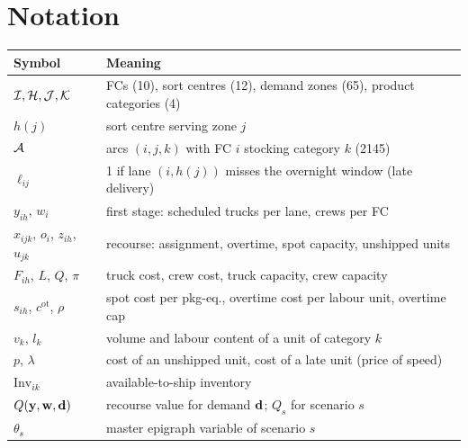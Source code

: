 \section{Notation}\label{app:notation}
\begin{center}\small
\begin{tabular}{@{}ll@{}}
\toprule
Symbol & Meaning \\ \midrule
$\mathcal{I},\mathcal{H},\mathcal{J},\mathcal{K}$ & FCs (10), sort centres (12), demand zones (65), product categories (4)\\
$h(j)$ & sort centre serving zone $j$ \\
$\mathcal{A}$ & arcs $(i,j,k)$ with FC $i$ stocking category $k$ (2145)\\
$\ell_{ij}$ & 1 if lane $(i,h(j))$ misses the overnight window (late delivery)\\
$y_{ih}$, $w_i$ & first stage: scheduled trucks per lane, crews per FC \\
$x_{ijk}$, $o_i$, $z_{ih}$, $u_{jk}$ & recourse: assignment, overtime, spot capacity, unshipped units\\
$F_{ih}$, $L$, $Q$, $\pi$ & truck cost, crew cost, truck capacity, crew capacity \\
$s_{ih}$, $c^{\mathrm{ot}}$, $\rho$ & spot cost per pkg-eq., overtime cost per labour unit, overtime cap \\
$v_k$, $l_k$ & volume and labour content of a unit of category $k$ \\
$p$, $\lambda$ & cost of an unshipped unit, cost of a late unit (price of speed)\\
$\mathrm{Inv}_{ik}$ & available-to-ship inventory\\
$Q(\mathbf{y},\mathbf{w},\mathbf{d})$ & recourse value for demand $\mathbf{d}$; $Q_s$ for scenario $s$ \\
$\theta_s$ & master epigraph variable of scenario $s$ \\ \bottomrule
\end{tabular}
\end{center}

